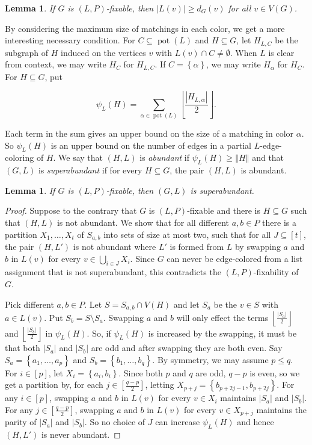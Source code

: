 \documentclass[12pt]{article}
\theoremstyle{plain}
\newtheorem{lem}[thm]{Lemma}
\theoremstyle{definition}
\theoremstyle{remark}
\newcommand{\set}[1]{\left\{ #1 \right\}}
\newcommand{\card}[1]{\left|#1\right|}
\newcommand{\size}[1]{\left\Vert#1\right\Vert}
\newcommand{\floor}[1]{\left\lfloor#1\right\rfloor}
\newcommand{\irange}[1]{\left[#1\right]}
\newcommand{\pot}{\operatorname{pot}}
\begin{document}
\begin{lem}\label{DegreeNecessaryCondition}
If $G$ is $(L, P)$-fixable, then $|L(v)| \ge d_G(v)$ for all $v \in V(G)$.
\end{lem}

By considering the maximum size of matchings in each color, we get a more interesting necessary condition.
For $C \subseteq \pot(L)$ and $H \subseteq G$, let $H_{L, C}$ be the
subgraph of $H$ induced on the vertices $v$ with $L(v) \cap C \ne \emptyset$. 
When $L$ is clear from context, we may write $H_C$ for $H_{L,C}$. If $C =
\set{\alpha}$, we may write $H_\alpha$ for $H_C$.  For $H \subseteq G$, put

\[\psi_L(H) = \sum_{\alpha \in \pot(L)} \floor{\frac{\card{H_{L, \alpha}}}{2}}.\]

Each term in the sum gives an upper bound on the size of a matching in color
$\alpha$. So $\psi_L(H)$ is an upper bound on the number of edges in a
partial $L$-edge-coloring of $H$.  We say that $(H, L)$ is \emph{abundant} if
$\psi_L(H) \ge \size{H}$ and that $(G,L)$ is \emph{superabundant} if for every
$H \subseteq G$, the pair $(H, L)$ is abundant.  

\begin{lem}\label{SuperabundanceIsNecessary}
If $G$ is $(L, P)$-fixable, then $(G, L)$ is superabundant.
\end{lem}
\begin{proof}
Suppose to the contrary that $G$ is $(L, P)$-fixable and there is $H \subseteq G$ such that $(H, L)$ is not abundant. We show that for all different $a,b \in P$ there is a partition $X_1, \ldots, X_t$ of $S_{a,b}$ into sets of size at most two, such that for all $J \subseteq \irange{t}$, the pair $(H,L')$ is not abundant where $L'$ is formed from $L$ by swapping $a$ and $b$ in $L(v)$ for every $v \in \bigcup_{i \in J} X_i$.  Since $G$ can never be edge-colored from a list assignment that is not superabundant, this contradicts the $(L,P)$-fixability of $G$.

Pick different $a,b \in P$.  Let $S = S_{a,b} \cap V(H)$ and let $S_a$ be the $v \in S$ with $a \in L(v)$.  Put $S_b = S\setminus S_a$.  Swapping $a$ and $b$ will only effect the terms $\floor{\frac{\card{S_a}}{2}}$ and $\floor{\frac{\card{S_b}}{2}}$ in $\psi_L(H)$.  So, if $\psi_L(H)$ is increased by the swapping, it must be that both $|S_a|$ and $|S_b|$ are odd and after swapping they are both even.  Say $S_a = \set{a_1, \ldots,a_p}$ and $S_b = \set{b_1, \ldots,b_q}$.  By symmetry, we may assume $p \le q$.  For $i \in \irange{p}$, let $X_i = \set{a_i, b_i}$.  Since both $p$ and $q$ are odd, $q-p$ is even, so we get a partition by, for each $j \in \irange{\frac{q-p}{2}}$, letting $X_{p + j} = \set{b_{p + 2j - 1}, b_{p + 2j}}$.  For any $i \in \irange{p}$, swapping $a$ and $b$ in $L(v)$ for every $v \in X_i$ maintains $|S_a|$ and $|S_b|$.  For any $j \in \irange{\frac{q-p}{2}}$, swapping $a$ and $b$ in $L(v)$ for every $v \in X_{p+j}$ maintains the parity of $|S_a|$ and $|S_b|$.  So no choice of $J$ can increase $\psi_L(H)$ and hence $(H,L')$ is never abundant.
\end{proof}
\end{document}

